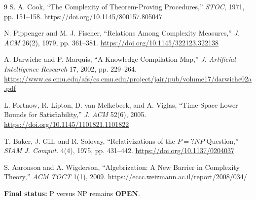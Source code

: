 \documentclass[11pt]{article}
\newcommand{\OPEN}{\textbf{OPEN}}
\begin{document}
\begin{thebibliography}{9}
S. A. Cook, ``The Complexity of Theorem-Proving Procedures,''
\emph{STOC}, 1971, pp. 151--158.
\url{https://doi.org/10.1145/800157.805047}

N. Pippenger and M. J. Fischer, ``Relations Among Complexity Measures,''
\emph{J. ACM} 26(2), 1979, pp. 361--381.
\url{https://doi.org/10.1145/322123.322138}

A. Darwiche and P. Marquis, ``A Knowledge Compilation Map,''
\emph{J. Artificial Intelligence Research} 17, 2002, pp. 229--264.
\url{https://www.cs.cmu.edu/afs/cs.cmu.edu/project/jair/pub/volume17/darwiche02a.pdf}

L. Fortnow, R. Lipton, D. van Melkebeek, and A. Viglas,
``Time-Space Lower Bounds for Satisfiability,'' \emph{J. ACM} 52(6), 2005.
\url{https://doi.org/10.1145/1101821.1101822}

T. Baker, J. Gill, and R. Solovay, ``Relativizations of the $P=?NP$
Question,'' \emph{SIAM J. Comput.} 4(4), 1975, pp. 431--442.
\url{https://doi.org/10.1137/0204037}

S. Aaronson and A. Wigderson, ``Algebrization: A New Barrier in Complexity
Theory,'' \emph{ACM TOCT} 1(1), 2009.
\url{https://eccc.weizmann.ac.il/report/2008/034/}
\end{thebibliography}

\noindent\textbf{Final status:} P versus NP remains \OPEN.

\end{document}
